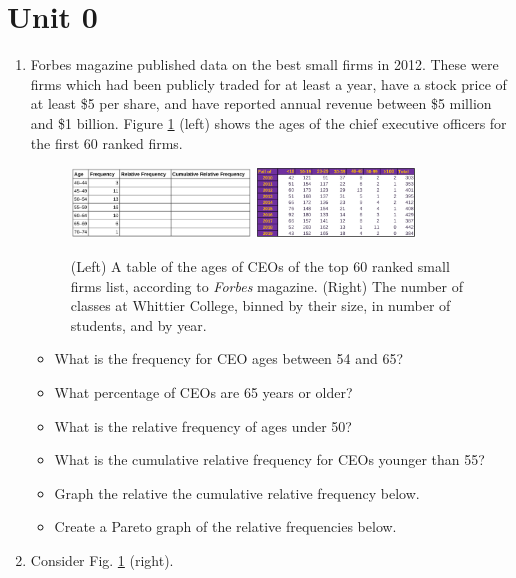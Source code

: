 \documentclass{article}
\begin{document}
\section{Unit 0}

\begin{enumerate}
\item Forbes magazine published data on the best small firms in 2012. These were firms which had been publicly traded for
at least a year, have a stock price of at least \$5 per share, and have reported annual revenue between \$5 million and \$1
billion. Figure \ref{fig:ages} (left) shows the ages of the chief executive officers for the first 60 ranked firms.
\begin{figure}[ht]
\centering
\includegraphics[width=0.45\textwidth]{figures/ages.png}
\includegraphics[width=0.4\textwidth]{figures/class_size.png}
\caption{\label{fig:ages} (Left) A table of the ages of CEOs of the top 60 ranked small firms list, according to \textit{Forbes} magazine. (Right) The number of classes at Whittier College, binned by their size, in number of students, and by year. }
\end{figure}
\begin{itemize}
\item What is the frequency for CEO ages between 54 and 65?
\item What percentage of CEOs are 65 years or older?
\item What is the relative frequency of ages under 50?
\item What is the cumulative relative frequency for CEOs younger than 55?
\item Graph the relative the cumulative relative frequency below.
\item Create a Pareto graph of the relative frequencies below.
\end{itemize}
\vspace{2cm}
\item Consider Fig. \ref{fig:ages} (right).
\begin{itemize}

\end{itemize}
\end{enumerate}
\end{document}
